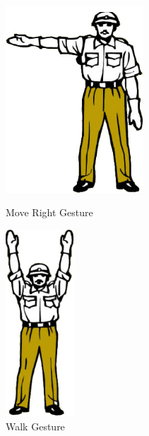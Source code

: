 \begin{figure}
\begin{minipage}
	\end{minipage}
	\begin{minipage}
		{.45 
		\textwidth} \centering 
		\includegraphics[height=7cm]{figures/content/ges-move-right.jpg} \caption{Move Right Gesture} \label{fg:ges:5} 
	\end{minipage}
	\begin{minipage}
		{.45 
		\textwidth} \centering 
		\includegraphics[height=7cm]{figures/content/ges-walk.jpg} \caption{Walk Gesture} \label{fg:ges:1} 
	\end{minipage}	
\end{figure}
\label{fg:ges:hands} 
